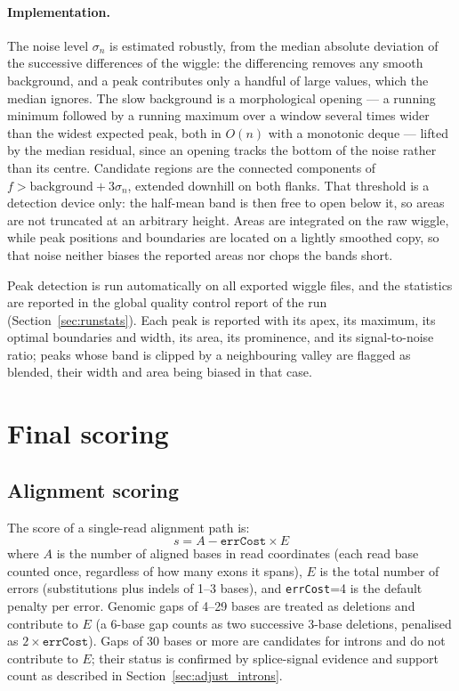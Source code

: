 \documentclass[11pt]{article}
\begin{document}
\paragraph{Implementation.}
The noise level $\sigma_n$ is estimated robustly, from the median
absolute deviation of the successive differences of the wiggle: the
differencing removes any smooth background, and a peak contributes only
a handful of large values, which the median ignores. The slow background
is a morphological opening --- a running minimum followed by a running
maximum over a window several times wider than the widest expected peak,
both in $O(n)$ with a monotonic deque --- lifted by the median residual,
since an opening tracks the bottom of the noise rather than its centre.
Candidate regions are the connected components of
$f > \text{background} + 3\sigma_n$, extended downhill on both flanks.
That threshold is a detection device only: the half-mean band is then
free to open below it, so areas are not truncated at an arbitrary height.
Areas are integrated on the raw wiggle, while peak positions and
boundaries are located on a lightly smoothed copy, so that noise neither
biases the reported areas nor chops the bands short.

Peak detection is run automatically on all exported wiggle files, and
the statistics are reported in the global quality control report of the
run (Section~\ref{sec:runstats}). Each peak is reported with its apex,
its maximum, its optimal boundaries and width, its area, its prominence,
and its signal-to-noise ratio; peaks whose band is clipped by a
neighbouring valley are flagged as blended, their width and area being
biased in that case.

\section {Final scoring}
\label{sec:scoring}

\subsection{Alignment scoring}

The score of a single-read alignment path is:
\[
  s = A - \texttt{errCost} \times E
\]
where $A$ is the number of aligned bases in read coordinates
(each read base counted once, regardless of how many exons it spans),
$E$ is the total number of errors (substitutions plus indels of
1--3 bases), and \texttt{errCost}=4 is the default penalty per error.
Genomic gaps of 4--29 bases are treated as deletions and contribute
to $E$ (a 6-base gap counts as two successive 3-base deletions,
penalised as $2 \times \texttt{errCost}$).
Gaps of 30 bases or more are candidates for introns and do not
contribute to $E$; their status is confirmed by splice-signal
evidence and support count as described in
Section~\ref{sec:adjust_introns}.
\end{document}
